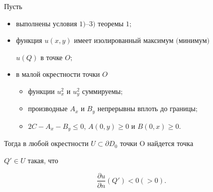 \begin{thm}


Пусть


\begin{itemize}


\item[1)] выполнены условия $1)$--$3)$ теоремы $1;$ 


\item[2)] функция $u(x,y)$ имеет изолированный максимум $($минимум$)$


$u(Q)$ в точке $O;$


\item[3)] в малой окрестности точки $O$


\begin{itemize}


\item[a)] функции $u_x^2$ и $u_y^2$ суммируемы$;$


\item[б)] производные $A_x$ и $B_y$ непрерывны вплоть до границы$;$


\item[в)] $2C-A_x-B_y\le 0$, $A(0,y)\ge 0$ и $B(0,x)\ge 0$.


\end{itemize}


\end{itemize}


Тогда в любой окрестности $U\subset \partial D_0$ точки O найдется точка


$Q'\in U$ такая, что


\begin{equation}


\frac {\partial u}{\partial n}(Q')<0 (>0).


\end{equation}


\end{thm}





